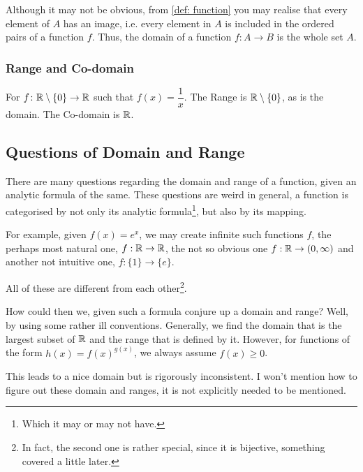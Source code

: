 Although it may not be obvious, from \cref{def: function} you may realise that every element
of \(A\) has an image, i.e. every element in \(A\) is included in the ordered pairs of a function
\(f\). Thus, the domain of a function \(f : A \to B\) is the whole set \(A\).

\subsubsection{Range and Co-domain}


\begin{example}
    For \(f \colon \mathbb R \setminus \left\{0\right\} \to \mathbb R\) such that \(f(x)=\dfrac{1}{x}\). The Range
    is \(\mathbb R \setminus \left\{0\right\}\), as is the domain. The Co-domain is \(\mathbb R\).
\end{example}

\subsection{Questions of Domain and Range}

\irrev

There are many questions regarding the domain and range of a function, given an
analytic formula of the same. These questions are weird in general, a function
is categorised by not only its analytic formula\footnote{Which it may or may not have.}, 
but also by its mapping.

For example, given \(f(x) = e^x\), we may create infinite such functions \(f\),
the perhaps most natural one, \(f : \mathbb R \to \mathbb R\), the not so obvious
one \(f : \mathbb R \to (0, \infty)\) and another not intuitive one, \(f : \{1\} \to \{e\}\).

All of these are different from each other\footnote{In fact, the second
one is rather special, since it is bijective, something covered a little later.}.

How could then we, given such a formula conjure up a domain and range? Well, by using
some rather ill conventions. Generally, we find the domain that is the largest
subset of \(\mathbb R\) and the range that is defined by it. However, for 
functions of the form \(h(x) = f(x)^{g(x)}\), we always assume \(f(x) \ge 0\). 

This leads to a nice domain but is rigorously inconsistent. I won't 
mention how to figure out these domain and ranges, it is not explicitly needed
to be mentioned.

